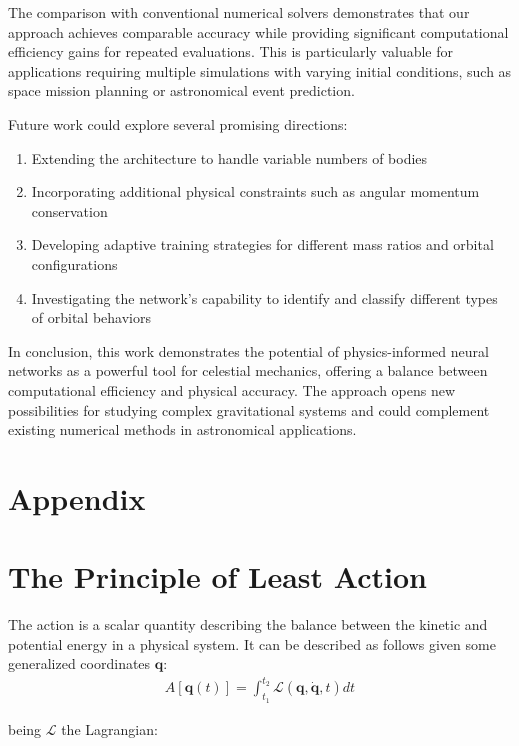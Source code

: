 \documentclass[draft]{agujournal2019}
\begin{document}
The comparison with conventional numerical solvers demonstrates that our approach achieves comparable accuracy while providing significant computational efficiency gains for repeated evaluations. This is particularly valuable for applications requiring multiple simulations with varying initial conditions, such as space mission planning or astronomical event prediction.

Future work could explore several promising directions:
\begin{enumerate}
    \item Extending the architecture to handle variable numbers of bodies
    \item Incorporating additional physical constraints such as angular momentum conservation
    \item Developing adaptive training strategies for different mass ratios and orbital configurations
    \item Investigating the network's capability to identify and classify different types of orbital behaviors
\end{enumerate}

In conclusion, this work demonstrates the potential of physics-informed neural networks as a powerful tool for celestial mechanics, offering a balance between computational efficiency and physical accuracy. The approach opens new possibilities for studying complex gravitational systems and could complement existing numerical methods in astronomical applications.

\section{Appendix}
\appendix
\section{The Principle of Least Action}
\begin{definition}
    The action is a scalar quantity describing the balance between the kinetic and potential energy in a physical system. It can be described as follows given some generalized coordinates $\mathbf{q}$:
    \begin{align*}
        A\left[ \mathbf{q}(t) \right] = \int_{t_1}^{t_2} \mathcal{L}\left(\mathbf{q}, \dot{\mathbf{q}}, t\right) dt
    \end{align*}
\end{definition}

being $\mathcal{L}$ the Lagrangian:
\end{document}
